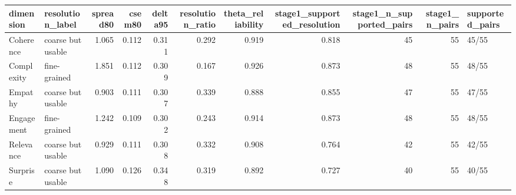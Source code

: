 \begin{tabular}{llrrrrrrrrl}
\toprule
dimension & resolution\_label & spread80 & csem80 & delta95 & resolution\_ratio & theta\_reliability & stage1\_supported\_resolution & stage1\_n\_supported\_pairs & stage1\_n\_pairs & supported\_pairs \\
\midrule
Coherence & coarse but usable & 1.065 & 0.112 & 0.311 & 0.292 & 0.919 & 0.818 & 45 & 55 & 45/55 \\
Complexity & fine-grained & 1.851 & 0.112 & 0.309 & 0.167 & 0.926 & 0.873 & 48 & 55 & 48/55 \\
Empathy & coarse but usable & 0.903 & 0.111 & 0.307 & 0.339 & 0.888 & 0.855 & 47 & 55 & 47/55 \\
Engagement & fine-grained & 1.242 & 0.109 & 0.302 & 0.243 & 0.914 & 0.873 & 48 & 55 & 48/55 \\
Relevance & coarse but usable & 0.929 & 0.111 & 0.308 & 0.332 & 0.908 & 0.764 & 42 & 55 & 42/55 \\
Surprise & coarse but usable & 1.090 & 0.126 & 0.348 & 0.319 & 0.892 & 0.727 & 40 & 55 & 40/55 \\
\bottomrule
\end{tabular}
